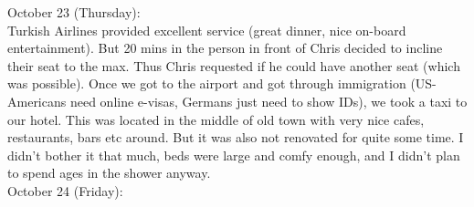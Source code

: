 October 23 (Thursday):\\
Turkish Airlines provided excellent service (great dinner, nice on-board entertainment). But 20 mins in the person in front of Chris decided to incline their seat to the max. Thus Chris requested if he could have another seat (which was possible). Once we got to the airport and got through immigration (US-Americans need online e-visas, Germans just need to show IDs), we took a taxi to our hotel. This was located in the middle of old town with very nice cafes, restaurants, bars etc around. But it was also not renovated for quite some time. I didn't bother it that much, beds were large and comfy enough, and I didn't plan to spend ages in the shower anyway.\\

October 24 (Friday):\\
